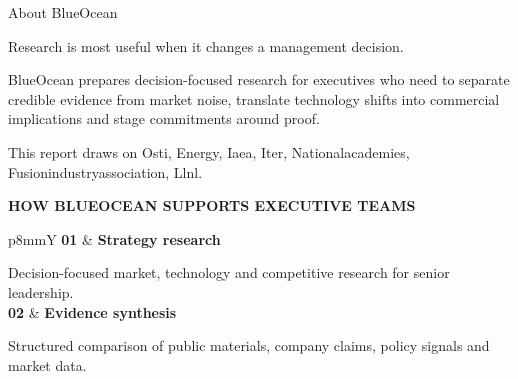 \documentclass[10pt,a4paper]{article}
\begin{document}
\clearpage
\noindent{}\par\vspace{8pt}
{\sffamily\fontsize{24}{30}\selectfont\color{BONavy} About BlueOcean}\par\vspace{10pt}
\begin{minipage}[t]{0.44\linewidth}
{\sffamily\fontsize{16}{22}\selectfont\color{BOGreen} Research is most useful when it changes a management decision.}\par\vspace{8pt}
{\footnotesize\color{BOText} BlueOcean prepares decision-focused research for executives who need to separate credible evidence from market noise, translate technology shifts into commercial implications and stage commitments around proof.}\par\vspace{7pt}
{\footnotesize\color{BOMuted} This report draws on Osti, Energy, Iaea, Iter, Nationalacademies, Fusionindustryassociation, Llnl.}\par
\vspace{10pt}
\end{minipage}\hfill\begin{minipage}[t]{0.48\linewidth}
{\textcolor{BOGreen}{\scriptsize\bfseries HOW BLUEOCEAN SUPPORTS EXECUTIVE TEAMS}}\par\vspace{5pt}
\begin{tabularx}{\linewidth}{p{8mm}Y}
\textcolor{BOGreen}{\bfseries 01} & {\scriptsize\bfseries Strategy research}\par{\scriptsize Decision-focused market, technology and competitive research for senior leadership.} \\[6pt]
\textcolor{BOGreen}{\bfseries 02} & {\scriptsize\bfseries Evidence synthesis}\par{\scriptsize Structured comparison of public materials, company claims, policy signals and market data.} \\[6pt]

\end{tabularx}
\end{minipage}
\end{document}
